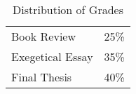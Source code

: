 \documentclass[titlepage]{article}
\newcommand\policy{../policy}
\begin{document}
\begin{table}[htbp]
  \centering
  {\lining
  \begin{tabular}{lr}
    \toprule
    Book Review      & 25\% \\
    Exegetical Essay & 35\% \\
    Final Thesis     & 40\% \\
    \bottomrule
  \end{tabular}}
  \caption{Distribution of Grades}
  \label{grade-dist}
\end{table}




\end{document}
